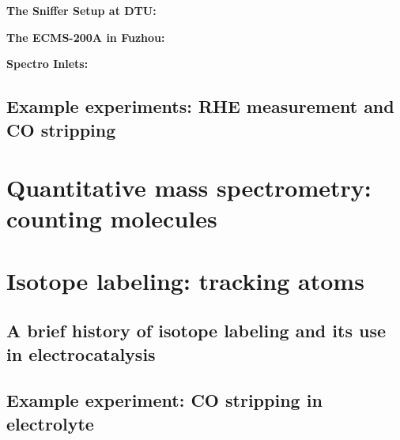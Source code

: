 \textbf{\large The Sniffer Setup at DTU:}


\textbf{\large The ECMS-200A in Fuzhou:}


\textbf{\large Spectro Inlets:}



\subsection{Example experiments: RHE measurement and CO stripping}\label{sec:examples}


\section{Quantitative mass spectrometry: counting molecules}


\section{Isotope labeling: tracking atoms}


\subsection{A brief history of isotope labeling and its use in electrocatalysis}


\subsection{Example experiment: CO stripping in  electrolyte}


